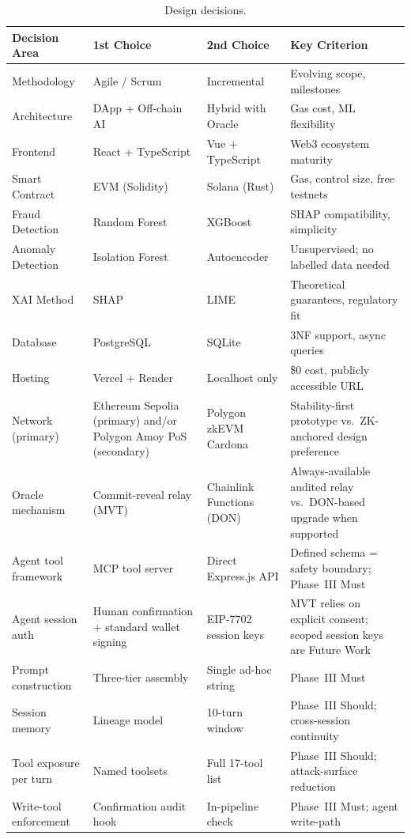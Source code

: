\documentclass[12pt,a4paper]{report}
\newcommand{\tableheadcolor}{\rowcolor{TableHeadBg}}
\begin{document}
\begin{table}[H]
\centering
\caption[Design decisions]{Design decisions.}
\label{tab:design-decisions}
\begin{tabular}{p{3cm}p{3cm}p{3cm}p{4.5cm}}
\toprule
\tableheadcolor
\textbf{Decision Area} & \textbf{1st Choice} & \textbf{2nd Choice} & \textbf{Key Criterion} \\
\midrule
Methodology & Agile / Scrum & Incremental & Evolving scope, milestones \\
Architecture & DApp + Off-chain AI & Hybrid with Oracle & Gas cost, ML flexibility \\
Frontend & React + TypeScript & Vue + TypeScript & Web3 ecosystem maturity \\
Smart Contract & EVM (Solidity) & Solana (Rust) & Gas, control size, free testnets \\
Fraud Detection & Random Forest & XGBoost & SHAP compatibility, simplicity \\
Anomaly Detection & Isolation Forest & Autoencoder & Unsupervised; no labelled data needed \\
XAI Method & SHAP & LIME & Theoretical guarantees, regulatory fit \\
Database & PostgreSQL & SQLite & 3NF support, async queries \\
Hosting & Vercel + Render & Localhost only & \$0 cost, publicly accessible URL \\
Network (primary) & Ethereum Sepolia (primary) and/or Polygon Amoy PoS (secondary) & Polygon zkEVM Cardona & Stability-first prototype vs.\ ZK-anchored design preference \\
Oracle mechanism & Commit-reveal relay (MVT) & Chainlink Functions (DON) & Always-available audited relay vs.\ DON-based upgrade when supported \\
Agent tool framework & MCP tool server & Direct Express.js API & Defined schema = safety boundary; Phase~III Must \\
Agent session auth & Human confirmation + standard wallet signing & EIP-7702 session keys & MVT relies on explicit consent; scoped session keys are Future Work \\
Prompt construction & Three-tier assembly & Single ad-hoc string & Phase~III Must \\
Session memory & Lineage model & 10-turn window & Phase~III Should; cross-session continuity \\
Tool exposure per turn & Named toolsets & Full 17-tool list & Phase~III Should; attack-surface reduction \\
Write-tool enforcement & Confirmation audit hook & In-pipeline check & Phase~III Must; agent write-path \\
\bottomrule
\end{tabular}
\end{table}
\end{document}
